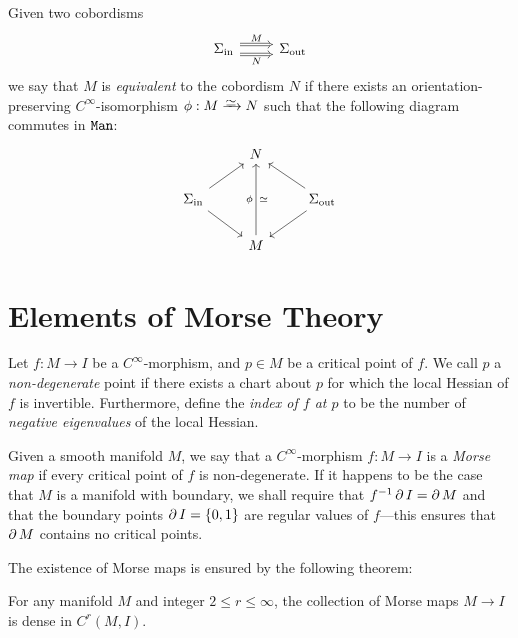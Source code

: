 \begin{definition}
\label{def:equivalence-of-cobordisms}
Given two cobordisms
\[
\begin{tikzcd}
\Sigma_{\text{in}} \ar[r, shift right=1.5, Rightarrow, "N"']
\ar[r, shift left=1.5, Rightarrow, "M"]
&\Sigma_{\text{out}}
\end{tikzcd}
\]
we say that \(M\) is \emph{equivalent} to the cobordism \(N\) if there exists an
orientation-preserving \(C^{\infty}\)-isomorphism \(\phi: M \isoto N\) such that
the following diagram commutes in \({\texttt{Man}}\):
\[
\begin{tikzcd}
&N &
\\
\Sigma_{\text{in}} \ar[ru] \ar[rd]
&
&\Sigma_{\text{out}} \ar[lu] \ar[ld]
\\
&M \ar[uu, "\phi", "\dis"']&
\end{tikzcd}
\]
\end{definition}

\section{Elements of Morse Theory}

\begin{definition}
\label{def:non-degenerate-point-and-index}
Let \(f: M \to I\) be a \(C^{\infty}\)-morphism, and \(p \in M\) be a critical
point of \(f\). We call \(p\) a \emph{non-degenerate} point if there exists a
chart about \(p\) for which the local Hessian of \(f\) is
invertible. Furthermore, define the \emph{index of \(f\) at \(p\)} to be the
number of \emph{negative eigenvalues} of the local Hessian.
\end{definition}

\begin{definition}
\label{def:morse-maps}
Given a smooth manifold \(M\), we say that a \(C^{\infty}\)-morphism
\(f: M \to I\) is a \emph{Morse map} if every critical point of \(f\) is
non-degenerate. If it happens to be the case that \(M\) is a manifold with
boundary, we shall require that \(f^{-1} \operatorname{\partial} I = \operatorname{\partial} M\) and that the boundary
points \(\operatorname{\partial} I = \{0, 1\}\) are regular values of \(f\)---this ensures that
\(\operatorname{\partial} M\) contains no critical points.
\end{definition}

The existence of Morse maps is ensured by the following theorem:

\begin{theorem}
\label{thm:morse-maps-are-dense}
For any manifold \(M\) and integer \(2 \leq r \leq \infty\), the collection of
Morse maps \(M \to I\) is dense in \(C^r(M, I)\).
\end{theorem}

